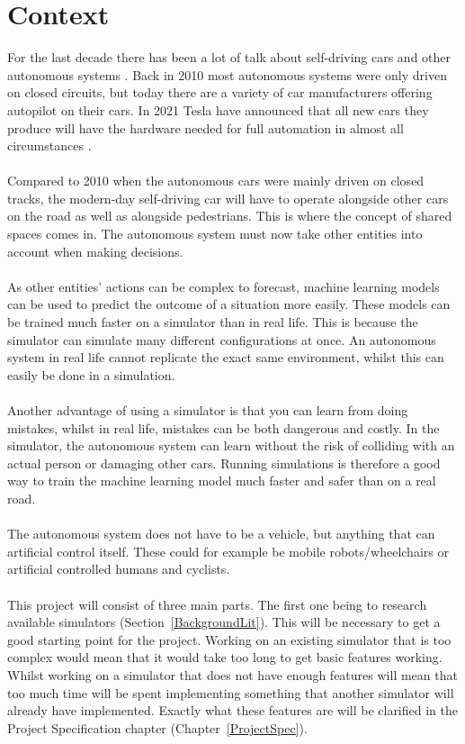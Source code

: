 \section{Context}
For the last decade there has been a lot of talk about self-driving cars and other autonomous systems \cite{markoff_2010}. Back in 2010 most autonomous systems were only driven on closed circuits, but today there are a variety of car manufacturers offering autopilot on their cars. In 2021 Tesla have announced that all new cars they produce will have the hardware needed for full automation in almost all circumstances \cite{teslaSelf}. 
\\~\\ 
Compared to 2010 when the autonomous cars were mainly driven on closed tracks, the modern-day self-driving car will have to operate alongside other cars on the road as well as alongside pedestrians.  This is where the concept of shared spaces comes in. The autonomous system must now take other entities into account when making decisions. 
\\~\\ 
As other entities’ actions can be complex to forecast, machine learning models can be used to predict the outcome of a situation more easily. These models can be trained much faster on a simulator than in real life. This is because the simulator can simulate many different configurations at once. An autonomous system in real life cannot replicate the exact same environment, whilst this can easily be done in a simulation.  
\\~\\ 
Another advantage of using a simulator is that you can learn from doing mistakes, whilst in real life, mistakes can be both dangerous and costly. In the simulator, the autonomous system can learn without the risk of colliding with an actual person or damaging other cars. Running simulations is therefore a good way to train the machine learning model much faster and safer than on a real road.  
\\~\\ 
The autonomous system does not have to be a vehicle, but anything that can artificial control itself. These could for example be mobile robots/wheelchairs or artificial controlled humans and cyclists. 
\\~\\ 
This project will consist of three main parts. The first one being to research available simulators (Section~\ref{BackgroundLit}). This will be necessary to get a good starting point for the project. Working on an existing simulator that is too complex would mean that it would take too long to get basic features working. Whilst working on a simulator that does not have enough features will mean that too much time will be spent implementing something that another simulator will already have implemented. Exactly what these features are will be clarified in the Project Specification chapter (Chapter~\ref{ProjectSpec}). 
